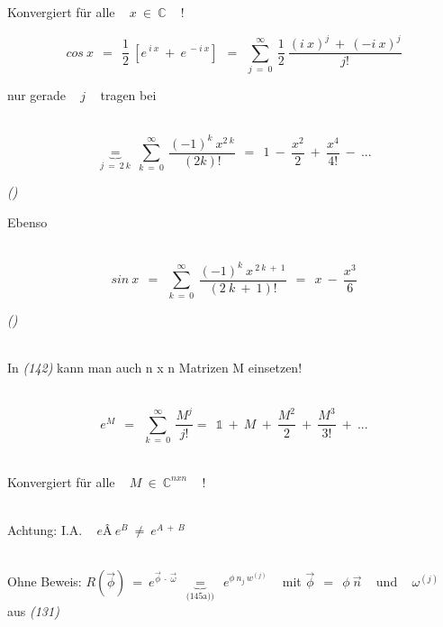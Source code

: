 \documentclass{scrreprt}
\newcounter{ec} %
\newcommand{\iec}{\addtocounter{ec}{1}\begin{flushright}\textit{(\arabic{ec})}\end{flushright}}
\begin{document}
	

	{\tableofcontents}
	
	\newpage

	
	
	
	
	\newpage
	
	\setcounter{ec}{143}
	
	Konvergiert für alle ~ $x ~ \in ~ \mathbb{C}$ ~ !
	
	\[ cos ~ x ~~ = ~~ \frac{1}{2} ~ \left[ e^{ ~ i ~ x} ~ + ~ e^{~ - i ~ x} \right] ~~ = ~~ \sum_{j ~ = ~ 0}^{\infty} ~ \frac{1}{2} ~ \frac{(i~x)^{j} ~ + ~ (-i ~ x)^j}{j!} \]
	
	nur gerade ~ $j$ ~ tragen bei
	
	~\\
	
	\[ \underbrace{=}_{j ~ = ~ 2 ~ k} ~ \sum_{k ~ = ~ 0}^{\infty} ~ \frac{(-1)^k ~ x^{2~k}}{(2k)!} ~~ = ~~ 1 ~ - ~ \frac{x^2}{2} ~ + ~ \frac{x^4}{4!} ~ - ~ ... \]
	
	\iec
	
	Ebenso 
	
	~\\
	
	\[ sin ~ x ~~ = ~~ \sum_{k ~ = ~ 0}^{\infty} ~ \frac{(-1)^k ~ x^{~ 2~k~+~1}}{(2~k ~+~ 1)!} ~~ = ~~ x ~ - ~ \frac{x^3}{6} \]
	
	\iec
	
	~\\
	
	In \textit{(142)} kann man auch n x n Matrizen M einsetzen!
	
	~\\
	
	\[ e^M ~~ = ~~ \sum_{k ~ = ~ 0}^{\infty} ~ \frac{M^j}{j!} = ~~ \mathbb{1} ~ + ~ M ~ + ~ \frac{M^2}{2} ~ + ~ \frac{M^3}{3!} ~ + ~ ... \]
	
	~\\
	
	Konvergiert für alle ~ $M ~ \in ~ \mathbb{C}^{n x n}$ ~ !
	
	~\\
	
	Achtung: I.A. ~ $eÂ ~ e^B ~ \neq ~ e^{A ~ + ~ B}$
	
	~\\
	
	Ohne Beweis: \qquad $R(\vec{\phi}) ~ = ~ e^{\vec{\phi} ~ \cdot ~ \vec{\omega}} ~~ \underbrace{=}_{\text{(145a)})} ~~ e^{\phi ~ n_j ~ w^{(j)}}$ ~ mit $\vec{\phi} ~~ = ~~ \phi ~ \vec{n} $ ~ und ~ $\omega^{(j)}$ ~ aus \textit{(131)} 
	
\end{document}
